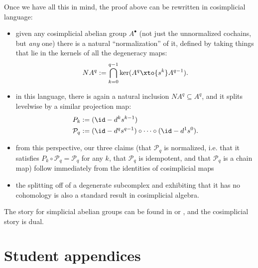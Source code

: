 \documentclass[11pt]{book}
\begin{document}
\begin{remark}
Once we have all this in mind, the proof above can be rewritten in cosimplicial language:
\begin{itemize}
    \item given any cosimplicial abelian group $A^\bullet$ (not just the unnormalized cochains, but \emph{any} one) there is a natural ``normalization'' of it, defined by taking things that lie in the kernels of all the degeneracy maps:
    \begin{align*}
        NA^q := \bigcap_{k=0}^{q-1} \ker(A^q \xto{s^k} A^{q-1}).
    \end{align*}
    \item in this language, there is again a natural inclusion $NA^q \subseteq A^q$, and it splits levelwise by a similar projection map:
    \begin{align*}
        P_k &:= (\id - d^k s^{k-1}) \\
        \mathcal{P}_q &:= (\id - d^q s^{q-1}) \circ \cdots \circ (\id - d^1 s^0).
    \end{align*}
    \item from this perspective, our three claims (that $\mathcal{P}_q$ is normalized, i.e. that it satisfies $P_k\circ \mathcal{P}_q = \mathcal{P}_q$ for any $k$, that $\mathcal{P}_q$ is idempotent, and that $\mathcal{P}_q$ is a chain map) follow immediately from the identities of cosimplicial maps
    \item the splitting off of a degenerate subcomplex and exhibiting that it has no cohomology is also a standard result in cosimplicial algebra. 
\end{itemize}
The story for simplicial abelian groups can be found in \cite[VIII.6]{Maclane-homology} or \cite[III.2]{GoerssJardine}, and the cosimplicial story is dual.
\end{remark}



\chapter{Student appendices}
\minitoc



%
%





\end{document}
